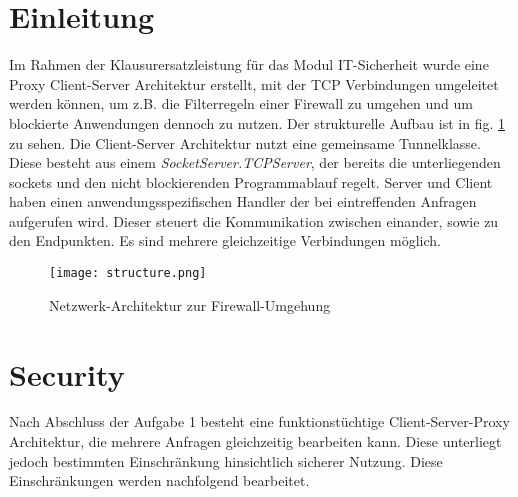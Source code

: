 \documentclass[12pt, a4paper]{scrartcl}
\begin{document}


\tableofcontents
\newpage
{}
\setcounter{lastroman}{\value{page}}

\pagestyle{plain}
\maketitle

\section{Einleitung}
Im Rahmen der Klausurersatzleistung für das Modul IT-Sicherheit wurde eine Proxy Client-Server Architektur erstellt, mit der TCP Verbindungen umgeleitet werden können, um z.B. die Filterregeln einer Firewall zu umgehen und um blockierte Anwendungen dennoch zu nutzen. Der strukturelle Aufbau ist in fig. \ref{fig::arch} zu sehen.\newline
Die Client-Server Architektur nutzt eine gemeinsame Tunnelklasse. Diese besteht aus einem \textit{SocketServer.TCPServer}, der bereits die unterliegenden sockets und den nicht blockierenden Programmablauf regelt. Server und Client haben einen anwendungsspezifischen Handler der bei eintreffenden Anfragen aufgerufen wird. Dieser steuert die Kommunikation zwischen einander, sowie zu den Endpunkten. Es sind mehrere gleichzeitige Verbindungen möglich.

\begin{figure}[H]
    \centering
    \texttt{[image: structure.png]}
    \caption{Netzwerk-Architektur zur Firewall-Umgehung}
    \label{fig::arch}
\end{figure}

\section{Security}
Nach Abschluss der Aufgabe 1 besteht eine funktionstüchtige Client-Server-Proxy Architektur, die mehrere Anfragen gleichzeitig bearbeiten kann. Diese unterliegt jedoch bestimmten Einschränkung hinsichtlich sicherer Nutzung. Diese Einschränkungen werden nachfolgend bearbeitet.
\end{document}
